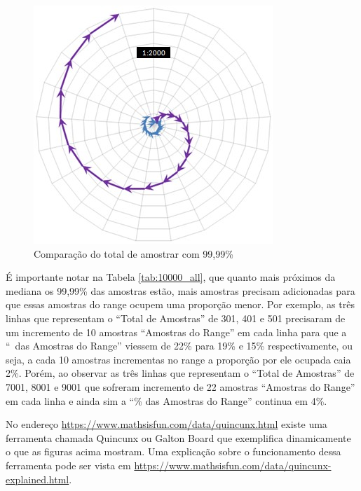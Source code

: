 \begin{figure}[H]
\caption{Comparação do total de amostrar com 99,99\% }
\label{fig:total_comparison_chart_with_99_range}
\centering
\includegraphics[scale=1]{sections/images/total_comparison_chart_with_99_range.jpg}
\end{figure}

É importante notar na Tabela \ref{tab:10000_all}, que quanto mais próximos da mediana os 99,99\% das amostras estão, mais amostras precisam adicionadas para que essas amostras do range ocupem uma proporção menor. Por exemplo, as três linhas que representam o “Total de Amostras” de 301, 401 e 501 precisaram de um incremento de 10 amostras “Amostras do Range” em cada linha para que a “\ das Amostras do Range” viessem de 22\% para 19\% e 15\% respectivamente, ou seja, a cada 10 amostras incrementas no range a proporção por ele ocupada caia 2\%. Porém, ao observar as três linhas que representam o “Total de Amostras” de 7001, 8001 e 9001 que sofreram incremento de 22 amostras “Amostras do Range” em cada linha e ainda sim a “\% das Amostras do Range” continua em 4\%.  

No endereço \url{https://www.mathsisfun.com/data/quincunx.html} existe uma ferramenta chamada Quincunx ou Galton Board que exemplifica dinamicamente o que as figuras acima mostram. Uma explicação sobre o funcionamento dessa ferramenta pode ser vista em \url{https://www.mathsisfun.com/data/quincunx-explained.html}. 